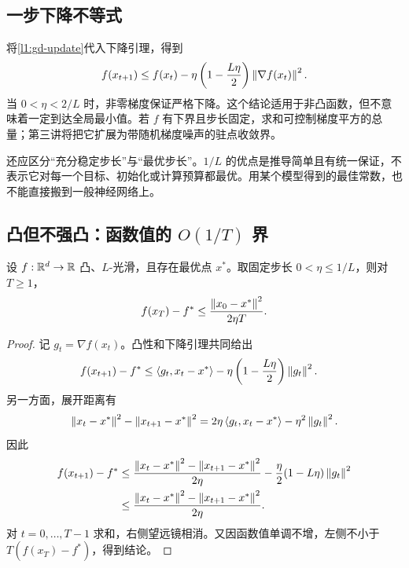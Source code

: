 \subsection{一步下降不等式}

将\eqref{l1:gd-update}代入下降引理，得到
\begin{equation}
 f(x_{t+1})\leq f(x_t)
 -\eta\left(1-\frac{L\eta}{2}\right)\left\lVert\nabla f(x_t)\right\rVert^2.
 \label{l1:gd-descent}
\end{equation}
当 $0<\eta<2/L$ 时，非零梯度保证严格下降。这个结论适用于非凸函数，但不意味着一定到达全局最小值。若 $f$ 有下界且步长固定，求和可控制梯度平方的总量；第三讲将把它扩展为带随机梯度噪声的驻点收敛界。

还应区分“充分稳定步长”与“最优步长”。$1/L$ 的优点是推导简单且有统一保证，不表示它对每一个目标、初始化或计算预算都最优。用某个模型得到的最佳常数，也不能直接搬到一般神经网络上。

\subsection{凸但不强凸：函数值的 $O(1/T)$ 界}

\begin{theorem}[光滑凸梯度下降]
\label{l1:thm-gd-convex}
设 $f:\mathbb R^d\to\mathbb R$ 凸、$L$-光滑，且存在最优点 $x^*$。取固定步长 $0<\eta\leq1/L$，则对 $T\geq1$，
\begin{equation}
 f(x_T)-f^*\leq\frac{\left\lVert x_0-x^*\right\rVert^2}{2\eta T}.
 \label{l1:gd-convex-rate}
\end{equation}
\end{theorem}

\begin{proof}
记 $g_t=\nabla f(x_t)$。凸性和下降引理共同给出
\begin{align*}
 f(x_{t+1})-f^*
 &\leq\left\langle g_t,x_t-x^*\right\rangle
       -\eta\left(1-\frac{L\eta}{2}\right)\left\lVert g_t\right\rVert^2.
\end{align*}
另一方面，展开距离有
\[
 \left\lVert x_t-x^*\right\rVert^2-\left\lVert x_{t+1}-x^*\right\rVert^2
 =2\eta\left\langle g_t,x_t-x^*\right\rangle-\eta^2\left\lVert g_t\right\rVert^2.
\]
因此
\begin{align}
 f(x_{t+1})-f^*
 &\leq\frac{\left\lVert x_t-x^*\right\rVert^2-\left\lVert x_{t+1}-x^*\right\rVert^2}{2\eta}
 -\frac\eta2(1-L\eta)\left\lVert g_t\right\rVert^2\\
 &\leq\frac{\left\lVert x_t-x^*\right\rVert^2-\left\lVert x_{t+1}-x^*\right\rVert^2}{2\eta}.
 \label{l1:gd-telescope}
\end{align}
对 $t=0,\ldots,T-1$ 求和，右侧望远镜相消。又因函数值单调不增，左侧不小于 $T(f(x_T)-f^*)$，得到结论。
\end{proof}

